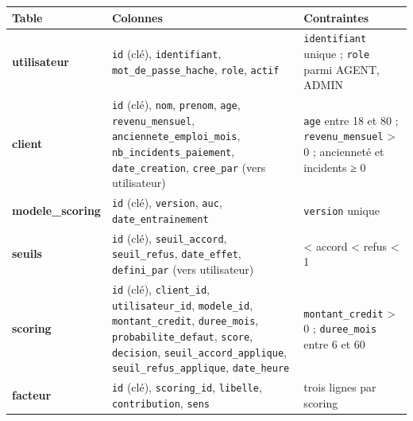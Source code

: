 \documentclass[
  french,
  11pt,
  a4paper,
]{article}
\begin{document}
\begin{longtable}[]{@{}
  >{\raggedright\arraybackslash}p{}
  >{\raggedright\arraybackslash}p{}
  >{\raggedright\arraybackslash}p{}@{}}
\toprule\noalign{}
\begin{minipage}[b]{\linewidth}\raggedright
Table
\end{minipage} & \begin{minipage}[b]{\linewidth}\raggedright
Colonnes
\end{minipage} & \begin{minipage}[b]{\linewidth}\raggedright
Contraintes
\end{minipage} \\
\midrule\noalign{}
\endhead
\bottomrule\noalign{}
\endlastfoot
\textbf{utilisateur} & \texttt{id} (clé), \texttt{identifiant},
\texttt{mot\_\allowbreak{}de\_\allowbreak{}passe\_\allowbreak{}hache},
\texttt{role}, \texttt{actif} & \texttt{identifiant} unique ;
\texttt{role} parmi AGENT, ADMIN \\
\textbf{client} & \texttt{id} (clé), \texttt{nom}, \texttt{prenom},
\texttt{age}, \texttt{revenu\_mensuel},
\texttt{anciennete\_\allowbreak{}emploi\_\allowbreak{}mois},
\texttt{nb\_\allowbreak{}incidents\_\allowbreak{}paiement},
\texttt{date\_creation}, \texttt{cree\_par} (vers utilisateur) &
\texttt{age} entre 18 et 80 ; \texttt{revenu\_mensuel} \textgreater{} 0
; ancienneté et incidents ≥ 0 \\
\textbf{modele\_scoring} & \texttt{id} (clé), \texttt{version},
\texttt{auc}, \texttt{date\_\allowbreak{}entrainement} &
\texttt{version} unique \\
\textbf{seuils} & \texttt{id} (clé), \texttt{seuil\_accord},
\texttt{seuil\_refus}, \texttt{date\_effet}, \texttt{defini\_par} (vers
utilisateur) & 0 \textless{} accord \textless{} refus \textless{} 1 \\
\textbf{scoring} & \texttt{id} (clé), \texttt{client\_id},
\texttt{utilisateur\_id}, \texttt{modele\_id}, \texttt{montant\_credit},
\texttt{duree\_mois}, \texttt{probabilite\_\allowbreak{}defaut},
\texttt{score}, \texttt{decision},
\texttt{seuil\_\allowbreak{}accord\_\allowbreak{}applique},
\texttt{seuil\_\allowbreak{}refus\_\allowbreak{}applique},
\texttt{date\_heure} & \texttt{montant\_credit} \textgreater{} 0 ;
\texttt{duree\_mois} entre 6 et 60 \\
\textbf{facteur} & \texttt{id} (clé), \texttt{scoring\_id},
\texttt{libelle}, \texttt{contribution}, \texttt{sens} & trois lignes
par scoring \\
\end{longtable}
\end{document}
